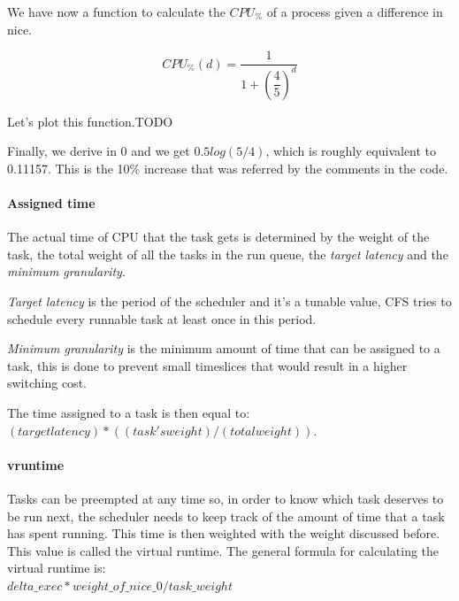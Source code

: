 \documentclass[10pt]{book}
\begin{document}
We have now a function to calculate the $CPU_\%$ of a process given a difference in nice. 

\begin{equation}
    CPU_\%(d)=\frac{1}{1+\left(\dfrac{4}{5}\right)^{d}}
\end{equation}

Let's plot this function.TODO


Finally, we derive in 0 and we get $0.5log(5/4)$, which is roughly equivalent to 0.11157. This is the 10\% increase that was referred by the comments in the code.

\paragraph{Assigned time}
The actual time of CPU that the task gets is determined by the weight of the task, the total weight of all the tasks in the run queue, the \textit{target latency} and the \textit{minimum granularity}. 

\textit{Target latency} is the period of the scheduler and it's a tunable value, CFS tries to schedule every runnable task at least once in this period. 

\textit{Minimum granularity} is the minimum amount of time that can be assigned to a task, this is done to prevent small timeslices that would result in a higher switching cost.

The time assigned to a task is then equal to: $(target latency) * ((task's weight)/(total weight))$. %

\paragraph{vruntime}

Tasks can be preempted at any time so, in order to know which task deserves to be run next, the scheduler needs to keep track of the amount of time that a task has spent running. This time is then weighted with the weight discussed before. This value is called the virtual runtime. The general formula for calculating the virtual runtime is: \\$delta\_exec * weight\_of\_nice\_0 / task\_weight$ %
\end{document}
